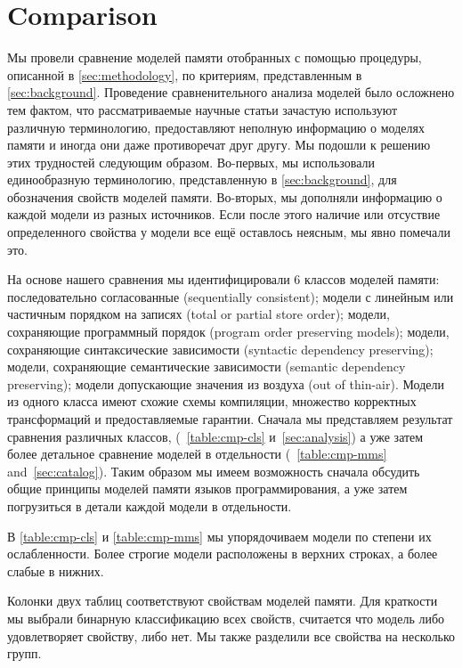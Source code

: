 \section{Comparison}
\label{sec:comparison}

Мы провели сравнение моделей памяти отобранных 
с помощью процедуры, описанной в \cref{sec:methodology},
по критериям, представленным в \cref{sec:background}. 
Проведение сравненительного анализа моделей было 
осложнено тем фактом, что рассматриваемые 
научные статьи зачастую используют различную терминологию, 
предоставляют неполную информацию о моделях памяти 
и иногда они даже противоречат друг другу. 
Мы подошли к решению этих трудностей следующим образом. 
Во-первых, мы использовали единообразную терминологию,
представленную в \cref{sec:background},
для обозначения свойств моделей памяти.
Во-вторых, мы дополняли информацию о каждой модели 
из разных источников. Если после этого 
наличие или отсуствие определенного свойства у модели 
все ещё оставлось неясным, мы явно помечали это. 

На основе нашего сравнения мы идентифицировали 6 классов моделей памяти:
последовательно согласованные (sequentially consistent); 
модели с линейным или частичным порядком на записях
(total or partial store order);
модели, сохраняющие программный порядок
(program order preserving models); 
модели, сохраняющие синтаксические зависимости 
(syntactic dependency preserving);
модели, сохраняющие семантические зависимости
(semantic dependency preserving);
модели допускающие значения из воздуха
(out of thin-air). 
Модели из одного класса имеют схожие схемы компиляции, 
множество корректных трансформаций и предоставляемые гарантии. 
Сначала мы представляем результат сравнения различных классов, 
(\see~\cref{table:cmp-cls} и~\cref{sec:analysis})
а уже затем более детальное сравнение моделей в отдельности
(\see~\cref{table:cmp-mms} and~\cref{sec:catalog}).
Таким образом мы имеем возможность сначала обсудить общие 
принципы моделей памяти языков программирования, 
а уже затем погрузиться в детали каждой модели в отдельности. 



В \cref{table:cmp-cls} и \cref{table:cmp-mms} 
мы упорядочиваем модели по степени их ослабленности. 
Более строгие модели расположены в верхних строках, 
а более слабые в нижних.  

Колонки двух таблиц соответствуют свойствам моделей памяти.
Для краткости мы выбрали бинарную классификацию всех свойств,
\ie считается что модель либо удовлетворяет свойству, либо нет. 
Мы также разделили все свойства на несколько групп. 

